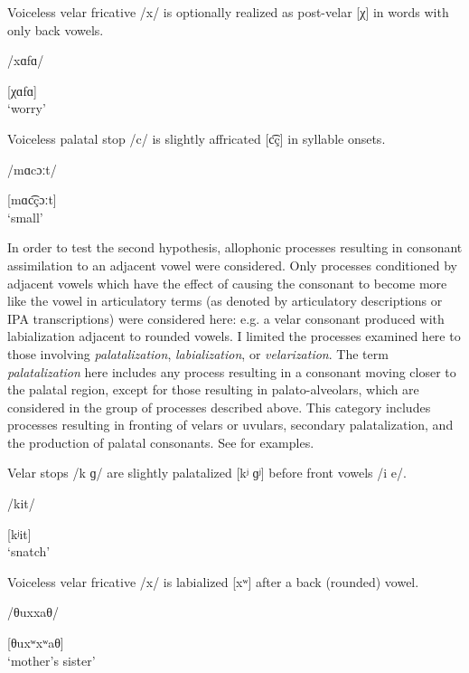 Voiceless velar fricative /x/ is optionally realized as post-velar [χ] in words with only back vowels.

/xɑfɑ/

[χɑfɑ]\\
\glt ‘worry’
\citep[11]{Poppe1964}
\z

\ea\label{ex:7.5}

Voiceless palatal stop /c/ is slightly affricated [c͡ç] in syllable onsets.

/mɑcɔːt/

[mɑc͡çɔːt]\\
\glt ‘small’
\citep[5]{Philips2007}
\z

  In order to test the second hypothesis, allophonic processes resulting in consonant assimilation to an adjacent vowel were considered. Only processes conditioned by adjacent vowels which have the effect of causing the consonant to become more like the vowel in articulatory terms (as denoted by articulatory descriptions or IPA transcriptions) were considered here: e.g. a velar consonant produced with labialization adjacent to rounded vowels. I limited the processes examined here to those involving \textit{palatalization}, \textit{labialization}, or \textit{velarization}. The term \textit{palatalization} here includes any process resulting in a consonant moving closer to the palatal region, except for those resulting in palato-alveolars, which are considered in the group of processes described above. This category includes processes resulting in fronting of velars or uvulars, secondary palatalization, and the production of palatal consonants. See  for examples.

\ea\label{ex:7.6}

Velar stops /k ɡ/ are slightly palatalized [kʲ ɡʲ] before front vowels /i e/.

/kit/

[kʲit]\\
\glt ‘snatch’
\citep[21]{Plaisier2007}
\z

\ea\label{ex:7.7}

Voiceless velar fricative /x/ is labialized [xʷ] after a back (rounded) vowel.

/θuxxaθ/

[θuxʷxʷaθ]\\
\glt ‘mother’s sister’
\citep[8]{Bright1957}
\z

\ea\label{ex:7.8}

